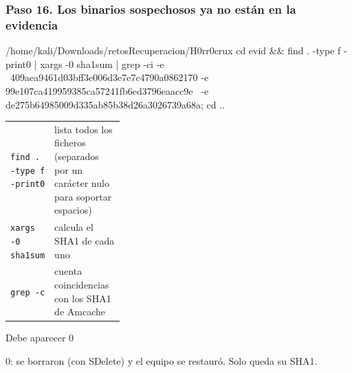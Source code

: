 \documentclass[11pt,a4paper]{article}
\begin{document}
\subsubsection*{Paso 16. Los binarios sospechosos ya no están en la evidencia}
\begin{comando}{/home/kali/Downloads/retosRecuperacion/H0rr0crux}
cd evid && find . -type f -print0 | xargs -0 sha1sum | grep -ci -e \
  409aea9461d03bff3e006d3e7e7c4790a0862170 -e 99e107ca419959385ca57241fb6ed3796eaacc9e \
  -e de275b64985009d335ab85b38d26a3026739a68a; cd ..
\end{comando}
\begin{tcolorbox}[enhanced, breakable, colback=gray!3, colframe=gray!35, boxrule=0.3pt, arc=1pt, left=4pt, right=4pt, top=2pt, bottom=2pt, fonttitle=\sffamily\scriptsize\bfseries, coltitle=black!70, colbacktitle=gray!10, title={Qué hace cada parte}, attach title to upper, before skip=2pt, after skip=4pt, fontupper=\small]
\par{\renewcommand{\arraystretch}{1.12}\begin{tabularx}{\linewidth}{@{}>{\raggedright\arraybackslash}p{0.33\linewidth}>{\raggedright\arraybackslash}X@{}}
\texttt{find . -type f -print0} & lista todos los ficheros (separados por un carácter nulo para soportar espacios) \\
\texttt{xargs -0 sha1sum} & calcula el SHA1 de cada uno \\
\texttt{grep -c} & cuenta coincidencias con los SHA1 de Amcache \\
\end{tabularx}}
\end{tcolorbox}
\begin{salida}{Debe aparecer}
0
\end{salida}
\begin{nota}0: se borraron (con SDelete) y el equipo se restauró. Solo queda su SHA1.\end{nota}
\end{document}
